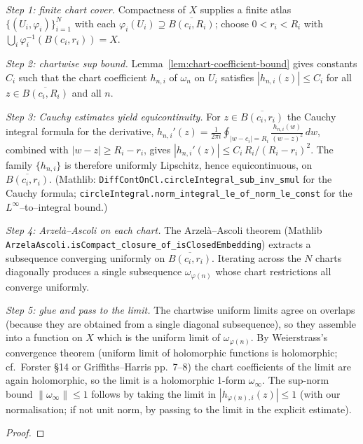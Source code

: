 \begin{proofsketch}
\emph{Step 1: finite chart cover.} Compactness of \(X\) supplies a
finite atlas \(\{(U_i,\varphi_i)\}_{i=1}^{N}\) with each
\(\varphi_i(U_i) \supseteq \overline{B(c_i, R_i)}\); choose
\(0 < r_i < R_i\) with \(\bigcup_i \varphi_i^{-1}(B(c_i, r_i)) = X\).

\emph{Step 2: chartwise sup bound.} Lemma~\ref{lem:chart-coefficient-bound}
gives constants \(C_i\) such that the chart coefficient
\(h_{n,i}\) of \(\omega_n\) on \(U_i\) satisfies
\(|h_{n,i}(z)| \le C_i\) for all \(z \in \overline{B(c_i, R_i)}\) and
all \(n\).

\emph{Step 3: Cauchy estimates yield equicontinuity.} For
\(z \in \overline{B(c_i, r_i)}\) the Cauchy integral formula for the
derivative,
\(h_{n,i}'(z) = \frac{1}{2\pi i}\oint_{|w-c_i|=R_i}
\frac{h_{n,i}(w)}{(w-z)^2}\,dw\),
combined with \(|w-z| \ge R_i - r_i\), gives
\(|h_{n,i}'(z)| \le C_i \,R_i / (R_i - r_i)^2\). The family
\(\{h_{n,i}\}\) is therefore uniformly Lipschitz, hence equicontinuous,
on \(\overline{B(c_i, r_i)}\). (Mathlib:
\texttt{DiffContOnCl.circleIntegral\_sub\_inv\_smul} for the
Cauchy formula;
\texttt{circleIntegral.norm\_integral\_le\_of\_norm\_le\_const} for the
\(L^{\infty}\)--to--integral bound.)

\emph{Step 4: Arzel\`a--Ascoli on each chart.} The Arzel\`a--Ascoli theorem
(Mathlib \texttt{ArzelaAscoli.isCompact\_closure\_of\_isClosedEmbedding})
extracts a subsequence converging uniformly on
\(\overline{B(c_i, r_i)}\). Iterating across the \(N\) charts
diagonally produces a single subsequence
\(\omega_{\varphi(n)}\) whose chart restrictions all converge
uniformly.

\emph{Step 5: glue and pass to the limit.} The chartwise uniform
limits agree on overlaps (because they are obtained from a single
diagonal subsequence), so they assemble into a function on \(X\) which
is the uniform limit of \(\omega_{\varphi(n)}\). By Weierstrass's
convergence theorem (uniform limit of holomorphic functions is
holomorphic; cf.\ Forster \S 14 or Griffiths--Harris pp.~7--8) the chart
coefficients of the limit are again holomorphic, so the limit is a
holomorphic 1-form \(\omega_\infty\). The sup-norm bound
\(\|\omega_\infty\|\le 1\) follows by taking the limit in
\(|h_{\varphi(n),i}(z)|\le 1\) (with our normalisation; if not unit
norm, by passing to the limit in the explicit estimate).
\end{proofsketch}


\begin{proof}\leanok\end{proof}

